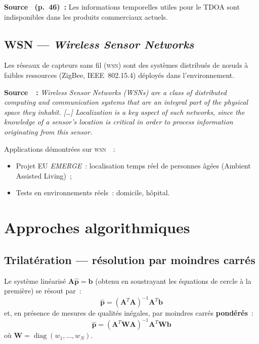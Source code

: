 \documentclass[12pt, a4paper]{article}
\newcommand{\WSN}{\textsc{wsn}}
\begin{document}
\begin{citebox}
\textbf{Source~\cite{Evennou2007} (p.~46)~:} \og{}Les informations temporelles
utiles pour le TDOA sont indisponibles dans les produits commerciaux actuels.\fg{}
\end{citebox}

\subsection{WSN — \textit{Wireless Sensor Networks}}

Les réseaux de capteurs sans fil (\WSN{}) sont des systèmes distribués de nœuds à
faibles ressources (ZigBee, IEEE~802.15.4) déployés dans l'environnement.

\begin{citebox}
\textbf{Source~\cite{Mitilineos2010}~:} \og{}\textit{Wireless Sensor Networks
(WSNs) are a class of distributed computing and communication systems that are an
integral part of the physical space they inhabit. [\ldots] Localization is a key
aspect of such networks, since the knowledge of a sensor's location is critical
in order to process information originating from this sensor.}\fg{}
\end{citebox}

Applications démontrées sur \WSN{}~\cite{Mitilineos2010}~:
\begin{itemize}
  \item Projet EU \textit{EMERGE}~: localisation temps réel de personnes âgées
        (Ambient Assisted Living)~;
  \item Tests en environnements réels~: domicile, hôpital.
\end{itemize}

\section{Approches algorithmiques}

\subsection{Trilatération — résolution par moindres carrés}

Le système linéarisé $\mathbf{A}\hat{\mathbf{p}} = \mathbf{b}$ (obtenu en
soustrayant les équations de cercle à la première) se résout par~:
\[
  \hat{\mathbf{p}} = (\mathbf{A}^T \mathbf{A})^{-1} \mathbf{A}^T \mathbf{b}
\]
et, en présence de mesures de qualités inégales, par moindres carrés \textbf{pondérés}~:
\[
  \hat{\mathbf{p}} = (\mathbf{A}^T \mathbf{W} \mathbf{A})^{-1}
                     \mathbf{A}^T \mathbf{W} \mathbf{b}
\]
où $\mathbf{W} = \operatorname{diag}(w_1, \ldots, w_N)$.
\end{document}
